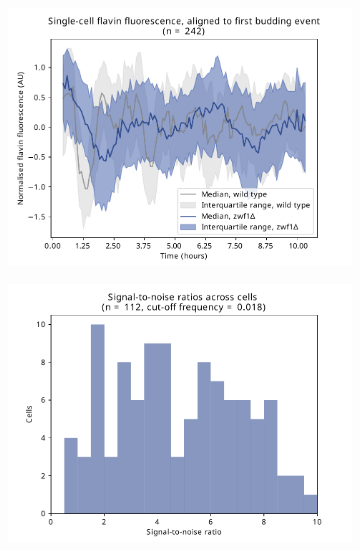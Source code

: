 \begin{figure}
  \begin{subfigure}[t]{0.45\textwidth}
   \centering
   \includegraphics[width=\textwidth]{zwf1egf_409_6.pdf}
   \caption{
   }
   \label{fig:biology-zwf1-median}
  \end{subfigure}%
  \begin{subfigure}[t]{0.45\textwidth}
   \centering
   \includegraphics[width=\textwidth]{zwf1egf_409_10.pdf}
   \caption{
   }
   \label{fig:biology-zwf1-snr}
  \end{subfigure}%


\end{figure}
